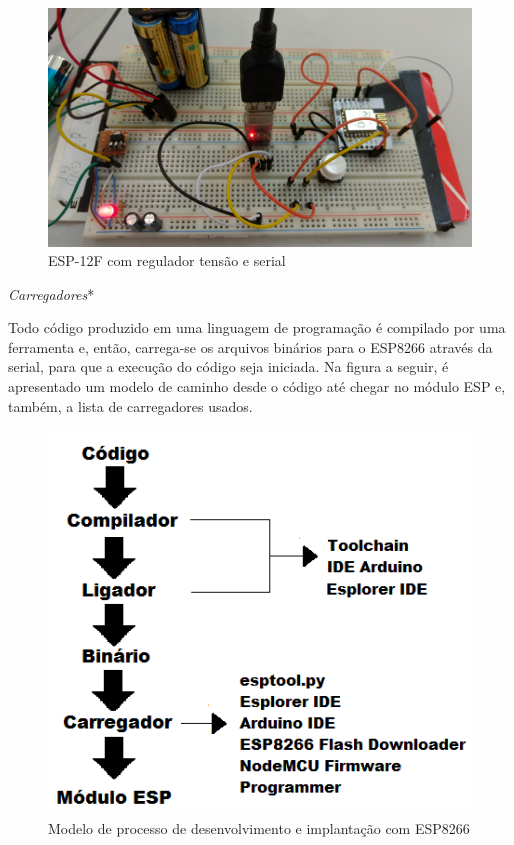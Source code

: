 \begin{figure}[htb]
	\caption{\label{fig:esp-pilha-serial}ESP-12F com regulador tensão e serial}
	\begin{center}
		\includegraphics[width=1\textwidth]{040-plataformas/esp-dev/breadboard.jpg}
	\end{center}
\end{figure}

\emph{Carregadores}*

Todo código produzido em uma linguagem de programação é compilado por uma
ferramenta e, então, carrega-se os arquivos binários para o ESP8266 através da
serial, para que a execução do código seja iniciada. Na figura a seguir, é
apresentado um modelo de caminho desde o código até chegar no módulo ESP e,
também, a lista de carregadores usados.

\begin{figure}[htb]
	\caption{\label{fig:esp-toolchain}Modelo de processo de desenvolvimento e implantação com ESP8266}
	\begin{center}
		\includegraphics[width=1\textwidth]{040-plataformas/esp-dev/toolchain.png}
	\end{center}
\end{figure}


